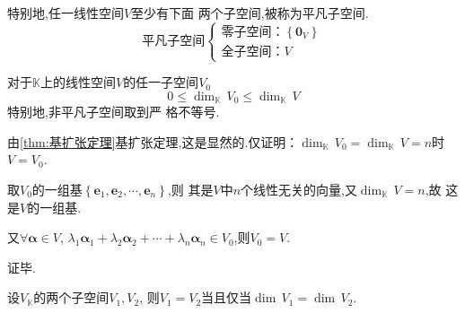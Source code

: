 \begin{formal}
\begin{theorem}[平凡子空间]\label{thm:平凡子空间}
    特别地,任一线性空间$V$至少有下面
两个子空间,被称为平凡子空间.
\[
\text{平凡子空间}
\begin{cases*}
    \text{零子空间：}\left\{
        \bm{0}_V
    \right\}\\
    \text{全子空间：}
        V
\end{cases*}
\]
\end{theorem}
\end{formal}
\begin{green}
\begin{lemma}[子空间的维数]\label{lem:子空间的维数}
    对于$\mathbb{K}$上的线性空间$V$的任一子空间$V_0$
    \[
    0 \leqslant 
    \dim_{\mathbb{K}}\,V_0
    \leqslant 
    \dim_{\mathbb{K}}\,V
    \]
    特别地,非平凡子空间取到严
    格不等号.
\end{lemma}
\begin{Proof}
由\cref{thm:基扩张定理}基扩张定理,这是显然的.仅证明：$\dim_{\mathbb{K}}\,V_0=\dim_{\mathbb{K}}\,V=n$时$V=V_0$.

取$V_0$的一组基$\left\{\bm{e}_1,\bm{e}_2,\cdots,\bm{e}_n\right\}$,则
其是$V$中$n$个线性无关的向量,又$\dim_{\mathbb{K}}\,V=n$,故
这是$V$的一组基.

又$\forall \bm{\alpha}\in V$,
$\lambda_1\bm{\alpha}_1+\lambda_2\bm{\alpha}_2+\cdots+\lambda_n\bm{\alpha}_n\in V_0$,则$V_0=V$.

证毕.
\end{Proof}
\end{green}
\begin{formal}
\begin{theorem}[子空间相等]\label{thm:子空间相等}
    设$V_{\mathbb{K}}$的两个子空间$V_1,V_2$,
    则$V_1=V_2$当且仅当$\dim\,V_1=\dim\,V_2.$
\end{theorem}
\end{formal}
